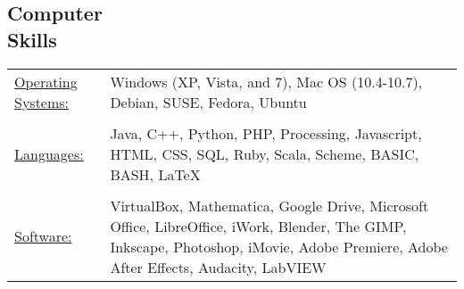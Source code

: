 \documentclass[margin]{res}
\begin{document}
\begin{resume}
\section{Computer \\ Skills}
\begin{tabular}{l p{3in}} %
  \underline{Operating Systems:} & Windows (XP, Vista, and 7), Mac OS (10.4-10.7), Debian, SUSE, Fedora, Ubuntu\\ \\
  \underline{Languages:} & Java, C++, Python, PHP, Processing, Javascript, HTML, CSS, SQL, Ruby, Scala, Scheme, BASIC, BASH, \LaTeX\\ \\
  \underline{Software:} & VirtualBox, Mathematica, Google Drive, Microsoft Office, LibreOffice, iWork, Blender, The GIMP, Inkscape, Photoshop, iMovie, Adobe Premiere, Adobe After Effects, Audacity, LabVIEW\\
\end{tabular}


\end{resume}
\end{document}
